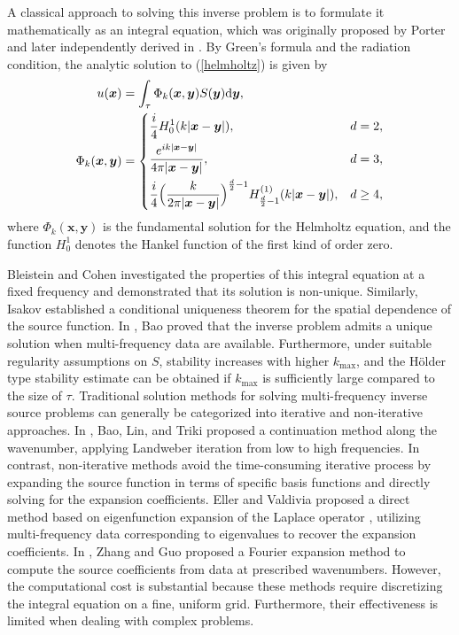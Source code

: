 \documentclass{article}
\theoremstyle{plain}
\theoremstyle{definition}
\begin{document}
A classical approach to solving this inverse problem is to formulate it mathematically as an integral equation,  which was originally proposed by Porter \cite{Imageformation, diffraction} and later independently derived in \cite{bojarski1973inverse}. By Green's formula and the radiation condition,  the analytic solution to (\ref{helmholtz}) is given by
\begin{align}\label{analytic}
u(\boldsymbol{x})&=\int_\tau\Phi_k(\boldsymbol{x}, \boldsymbol{y})S(\boldsymbol{y})\mathrm{d}\boldsymbol{y}, \\
\label{Fundamental solution}
\Phi_k(\boldsymbol{x}, \boldsymbol{y})&=\left \{
\begin{aligned}
&\frac{i}{4}H_{0}^{1}(k|\boldsymbol{x}-\boldsymbol{y}|),   &d=2, \\
&\frac{e^{ik|\boldsymbol{x}-\boldsymbol{y}|}}{4\pi|\boldsymbol{x}-\boldsymbol{y}|},  &d=3, \\
&\frac{i}{4}\Bigl(\frac{k}{2\pi|\boldsymbol{x}-\boldsymbol{y}|}\Bigr)^{\frac{d}{2}-1}H_{\frac{d}{2}-1}^{(1)}(k|\boldsymbol{x}-\boldsymbol{y}|), &d\ge4,
\end{aligned}
\right.
\end{align}
where $\Phi_k(\boldsymbol{x}, \boldsymbol{y})$ is the fundamental solution for the Helmholtz equation, and the function $H_0^1$ denotes the Hankel function of the first kind of order zero. 

Bleistein and Cohen \cite{bleistein1977nonuniqueness} investigated the properties of this integral equation at a fixed frequency and demonstrated that its solution is non-unique. Similarly, Isakov established a conditional uniqueness theorem \cite{isakov1990inverse} for the spatial dependence of the source function. In \cite{bao2010multi},  Bao proved that the inverse problem admits a unique solution when multi-frequency data are available. Furthermore,
under suitable regularity assumptions on $S$, stability increases with higher $k_{\text{max}}$,
and the H{\"o}lder type stability estimate can be obtained if $k_{\text{max}}$ is sufficiently large
compared to the size of $\tau$. Traditional solution methods for solving multi-frequency inverse source problems can generally be categorized into iterative and non-iterative approaches. In \cite{bao2011numerical}, Bao, Lin, and Triki proposed a continuation method along the wavenumber,  applying Landweber iteration from low to high frequencies. In contrast,  non-iterative methods avoid the time-consuming iterative process by expanding the source function in terms of specific basis functions and directly solving for the expansion coefficients. Eller and Valdivia proposed a direct method based on eigenfunction expansion of the Laplace operator \cite{eller2009acoustic}, utilizing multi-frequency data corresponding to eigenvalues to recover the expansion coefficients.  In \cite{zhang2015fourier},  Zhang and Guo proposed a Fourier expansion method to compute the source coefficients from data at prescribed wavenumbers. However,  the computational cost is substantial because these methods require discretizing the integral equation on a fine,  uniform grid. Furthermore, their effectiveness is limited when dealing with complex problems.
\end{document}
